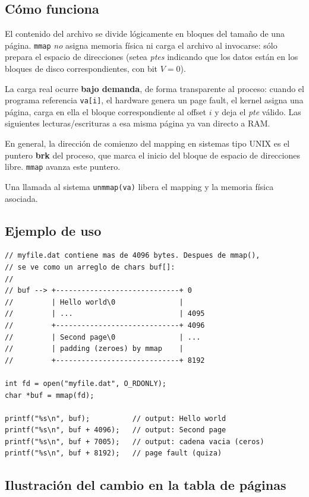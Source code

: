 \documentclass[11pt,a4paper]{article}
\begin{document}
\subsection{Cómo funciona}

El contenido del archivo se divide lógicamente en bloques del tamaño de
una página. \texttt{mmap} \emph{no} asigna memoria física ni carga el
archivo al invocarse: sólo prepara el espacio de direcciones (setea
\emph{ptes} indicando que los datos están en los bloques de disco
correspondientes, con bit $V=0$).

La carga real ocurre \textbf{bajo demanda}, de forma transparente al
proceso: cuando el programa referencia \texttt{va[i]}, el hardware
genera un page fault, el kernel asigna una página, carga en ella el
bloque correspondiente al offset $i$ y deja el \emph{pte} válido. Las
siguientes lecturas/escrituras a esa misma página ya van directo a RAM.

En general, la dirección de comienzo del mapping en sistemas tipo UNIX
es el puntero \textbf{brk} del proceso, que marca el inicio del bloque
de espacio de direcciones libre. \texttt{mmap} avanza este puntero.

Una llamada al sistema \texttt{unmmap(va)} libera el mapping y la
memoria física asociada.

\subsection{Ejemplo de uso}

\begin{lstlisting}[style=cstyle]
// myfile.dat contiene mas de 4096 bytes. Despues de mmap(),
// se ve como un arreglo de chars buf[]:
//
// buf --> +-----------------------------+ 0
//         | Hello world\0               |
//         | ...                         | 4095
//         +-----------------------------+ 4096
//         | Second page\0               | ...
//         | padding (zeroes) by mmap    |
//         +-----------------------------+ 8192

int fd = open("myfile.dat", O_RDONLY);
char *buf = mmap(fd);

printf("%s\n", buf);          // output: Hello world
printf("%s\n", buf + 4096);   // output: Second page
printf("%s\n", buf + 7005);   // output: cadena vacia (ceros)
printf("%s\n", buf + 8192);   // page fault (quiza)
\end{lstlisting}

\subsection{Ilustración del cambio en la tabla de páginas}
\end{document}
